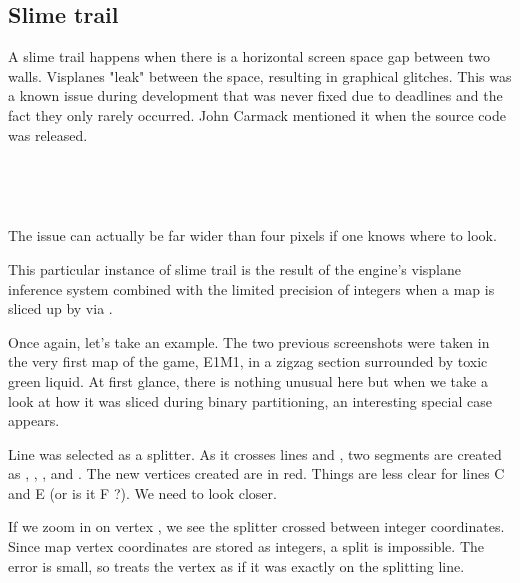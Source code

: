 \subsection{Slime trail}
A slime trail happens when there is a horizontal screen space gap between two walls. Visplanes "leak" between the space, resulting in graphical glitches. This was a known issue during development that was never fixed due to deadlines and the fact they only rarely occurred. John Carmack mentioned it when the  source code was released.\\
\par
{}\\\par
{}\\
\par
The issue can actually be far wider than four pixels if one knows where to look.\\
\par
{}
\par
\vspace{10pt}
This particular instance of slime trail is the result of the engine's visplane inference system combined with the limited precision of integers when a map is sliced up by via .\\
\par
 Once again, let's take an example. The two previous screenshots were taken in the very first map of the game, E1M1, in a zigzag section surrounded by toxic green liquid. At first glance, there is nothing unusual here but when we take a look at how it was sliced during binary partitioning, an interesting special case appears.\\
\par
Line  was selected as a splitter. As it crosses lines  and , two segments are created as , , , and . The new vertices created are in red. Things are less clear for lines C and E (or is it F ?). We need to look closer. \\
\par
If we zoom in on vertex , we see the splitter crossed  between integer coordinates. Since map vertex coordinates are stored as integers, a split is impossible. The error is small, so  treats the vertex as if it was exactly on the splitting line.

